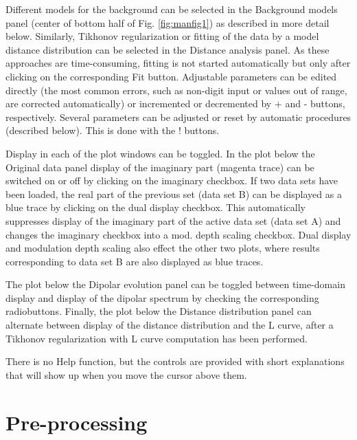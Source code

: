 \documentclass{article}
\begin{document}
Different models for the background can be selected in the {\ttfamily Background models} panel (center of bottom half of Fig. \ref{fig:manfig1}) as described in more detail below. Similarly, Tikhonov regularization or fitting of the data by a model distance distribution can be selected in the {\ttfamily Distance analysis} panel. As these approaches are time-consuming, fitting is not started automatically but only after clicking on the corresponding {\ttfamily Fit} button. Adjustable parameters can be edited directly (the most common errors, such as non-digit input or values out of range, are corrected automatically) or incremented or decremented by {\ttfamily +} and {\ttfamily -} buttons, respectively. Several parameters can be adjusted or reset by automatic procedures (described below). This is done with the {\ttfamily !} buttons.

Display in each of the plot windows can be toggled. In the plot below the {\ttfamily Original data} panel display of the imaginary part (magenta trace) can be switched on or off by clicking on the {\ttfamily imaginary} checkbox. If two data sets have been loaded, the real part of the previous set (data set B) can be displayed as a blue trace by clicking on the {\ttfamily dual display} checkbox. This automatically suppresses display of the imaginary part of the active data set (data set A) and changes the {\ttfamily imaginary} checkbox into a {\ttfamily mod. depth scaling} checkbox. Dual display and modulation depth scaling also effect the other two plots, where results corresponding to data set B are also displayed as blue traces.

The plot below the {\ttfamily Dipolar evolution} panel can be toggled between time-domain display and display of the dipolar spectrum by checking the corresponding radiobuttons. Finally, the plot below the {\ttfamily Distance distribution} panel can alternate between display of the distance distribution and the L curve, after a Tikhonov regularization with L curve computation has been performed.

There is no Help function, but the controls are provided with short explanations that will show up when you move the cursor above them. 

\section{Pre-processing}
\label{preprocess}
\end{document}
